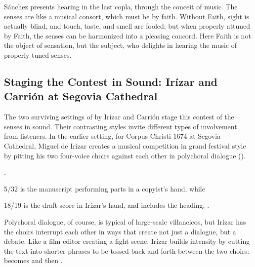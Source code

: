 Sánchez presents hearing in the last copla, through the conceit of music.
The senses are  like a musical consort, which must be 
 by faith.
Without Faith, sight is actually blind, and touch, taste, and smell are fooled; 
but when properly attuned by Faith, the senses can be harmonized into a 
pleasing concord.
Here Faith is not the object of sensation, but the subject, who delights in 
hearing the music of properly tuned senses.

\subsection{Staging the Contest in Sound: Irízar and Carrión at Segovia 
Cathedral}


The two surviving settings of  by Irízar and Carrión 
stage this contest of the senses in sound.
Their contrasting styles invite different types of involvement from listeners.
In the earlier setting, for Corpus Christi 1674 at Segovia Cathedral, Miguel de 
Irízar creates a musical competition in grand festival style by pitting his two 
four-voice choirs against each other in polychoral dialogue 
().%
\begin{Footnote}
    \Autocite{Cashner:SingingAboutSingingI}.
    \signature{E-SE}{5/32} is the manuscript performing parts in a copyist's 
    hand, while \signature{E-SE}{18/19} is the draft score in Irízar's hand, and 
    includes the heading, .
\end{Footnote}
Polychoral dialogue, of course, is typical of large-scale villancicos, but 
Irízar has the choirs interrupt each other in ways that create not just a 
dialogue, but a debate.
Like a film editor creating a fight scene, Irízar builds intensity by cutting 
the text into shorter phrases to be tossed back and forth between the two 
choirs:  becomes  and then 
.


